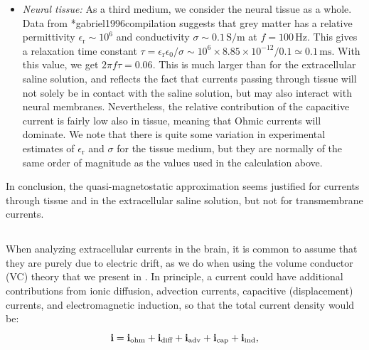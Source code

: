 \begin{itemize}
\item \textit{Neural tissue:} As a third medium, we consider the neural tissue as a whole. Data from \citeasnoun**{gabriel1996compilation} suggests that grey matter has a relative permittivity $\epsilon_\text{r} \sim 10^6$ and conductivity $\sigma \sim 0.1 \, \si{\siemens\per\metre}$ at $f = 100 \, \si{\hertz}$. This gives a relaxation time constant $\tau = \epsilon_\text{r} \epsilon_0/\sigma \sim 10^6\times 8.85\times10^{-12}/0.1 \simeq 0.1 \, \si{\milli\second}$. With this value, we get $2 \pi f \tau =  0.06$. This is much larger than for the extracellular saline solution, and reflects the fact that currents passing through tissue will not solely be in contact with the saline solution, but may also interact with neural membranes. Nevertheless, the relative contribution of the capacitive current is fairly low also in tissue, meaning that Ohmic currents will dominate. We note that there is quite some variation in experimental estimates of  $\epsilon_\text{r}$ and $\sigma$ for the tissue medium, but they are normally of the same order of magnitude as the values used in the calculation above.
\end{itemize}

In conclusion, the quasi-magnetostatic approximation seems justified for currents through tissue and in the extracellular saline solution, but not for transmembrane currents.


\subsection{}
\label{sec:Basics:onlyohmic}
When analyzing extracellular currents in the brain, it is common to assume that they are purely due to electric drift, as we do when using the volume conductor (VC) theory that we present in . In principle, a current could have additional contributions from ionic diffusion, advection currents, capacitive (displacement) currents, and electromagnetic induction, so that the total current density would be:
\begin{equation}
{\bf i} = {\bf i}_\text{ohm} + {\bf i}_\text{diff} + {\bf i}_\text{adv} + {\bf i}_\text{cap} + {\bf i}_\text{ind},
\label{VC:eq:generalcurrent}
\end{equation}

